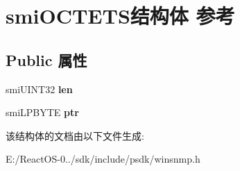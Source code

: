\hypertarget{structsmi_o_c_t_e_t_s}{}\section{smi\+O\+C\+T\+E\+T\+S结构体 参考}
\label{structsmi_o_c_t_e_t_s}
\subsection*{Public 属性}
\begin{DoxyCompactItemize}
\item 
\mbox{\label{structsmi_o_c_t_e_t_s_ae1a7c553bac0cfef3a9a25110ccc98b7}} 
smi\+U\+I\+N\+T32 {\bfseries len}
\item 
\mbox{\label{structsmi_o_c_t_e_t_s_aeccc320282a218753180fe101651e15c}} 
smi\+L\+P\+B\+Y\+TE {\bfseries ptr}
\end{DoxyCompactItemize}


该结构体的文档由以下文件生成\+:\begin{DoxyCompactItemize}
\item 
E\+:/\+React\+O\+S-\/0../sdk/include/psdk/winsnmp.\+h\end{DoxyCompactItemize}
